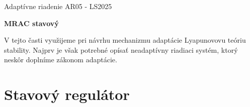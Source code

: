 \documentclass[a4paper, 10pt, ]{article}
\def\oznacenieCasti{AR05 - LS2025}
\begin{document}
\lstset{%
style=mystyle,
rangebeginprefix=\#\#\#\ cellB\ ,%
rangebeginsuffix=\ \#\#\#,%
rangeendprefix=\#\#\#\ cellE\ ,%
rangeendsuffix=\ \#\#\#,%
includerangemarker=false,
}




\fontsize{12pt}{22pt}\selectfont

\centerline{\textsf{Adaptívne riadenie} \hfill \textsf{\oznacenieCasti}}

\fontsize{18pt}{22pt}\selectfont








\begin{flushleft}
    \textbf{\textsf{MRAC stavový}}
\end{flushleft}







\normalsize

\bigskip

{\hypersetup{hidelinks}

\tableofcontents

}

\bigskip

\vspace{18pt}






\noindent
\lettrine[lines=3, nindent=0pt]{V}{} tejto časti využijeme pri návrhu mechanizmu adaptácie Lyapunovovu teóriu stability. Najprv je však potrebné opísať neadaptívny riadiaci systém, ktorý neskôr doplníme zákonom adaptácie.












\section{Stavový regulátor}
\label{Stavový regulátor ($n=2$)}
\end{document}
